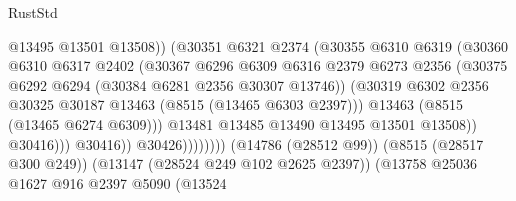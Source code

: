 \begin{lexlean}{RustStd}
\begin{coremodule}
                                            @13495
                                            @13501
                                            @13508))
                                        (@30351
                                          @6321
                                          @2374
                                          (@30355
                                            @6310
                                            @6319
                                            (@30360
                                              @6310
                                              @6317
                                              @2402
                                              (@30367
                                                @6296
                                                @6309
                                                @6316
                                                @2379
                                                @6273
                                                @2356
                                                (@30375
                                                  @6292
                                                  @6294
                                                  (@30384 @6281 @2356 @30307 @13746))
                                                (@30319
                                                  @6302
                                                  @2356
                                                  @30325
                                                  @30187
                                                  @13463
                                                  (@8515 (@13465 @6303 @2397)))
                                                @13463
                                                (@8515 (@13465 @6274 @6309)))
                                              @13481
                                              @13485
                                              @13490
                                              @13495
                                              @13501
                                              @13508))
                                          @30416)))
                                    @30416))
                                @30426))))))))
                (@14786 (@28512 @99))
                (@8515 (@28517 @300 @249))
                (@13147 (@28524 @249 @102 @2625 @2397))
                (@13758
                  @25036
                  @1627
                  @916
                  @2397
                  @5090
                  (@13524

\end{coremodule}
\end{lexlean}

